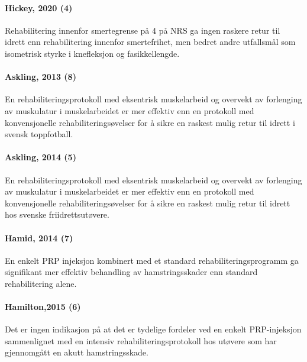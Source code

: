 \documentclass[
]{article}
\begin{document}
\hypertarget{hickey-2020-hickey2020-1}{%
\paragraph{Hickey, 2020 (4)}\label{hickey-2020-hickey2020-1}}

Rehabilitering innenfor smertegrense på 4 på NRS ga ingen raskere retur
til idrett enn rehabilitering innenfor smertefrihet, men bedret andre
utfallsmål som isometrisk styrke i knefleksjon og fasikkellengde.

\hypertarget{askling-2013-askling2013-1}{%
\paragraph{Askling, 2013 (8)}\label{askling-2013-askling2013-1}}

En rehabiliteringsprotokoll med eksentrisk muskelarbeid og overvekt av
forlenging av muskulatur i muskelarbeidet er mer effektiv enn en
protokoll med konvensjonelle rehabiliteringsøvelser for å sikre en
raskest mulig retur til idrett i svensk toppfotball.

\hypertarget{askling-2014-askling2014-1}{%
\paragraph{Askling, 2014 (5)}\label{askling-2014-askling2014-1}}

En rehabiliteringsprotokoll med eksentrisk muskelarbeid og overvekt av
forlenging av muskulatur i muskelarbeidet er mer effektiv enn en
protokoll med konvensjonelle rehabiliteringsøvelser for å sikre en
raskest mulig retur til idrett hos svenske friidrettsutøvere.

\hypertarget{hamid-2014-ahamid2014-1}{%
\paragraph{Hamid, 2014 (7)}\label{hamid-2014-ahamid2014-1}}

En enkelt PRP injeksjon kombinert med et standard
rehabiliteringsprogramm ga signifikant mer effektiv behandling av
hamstringsskader enn standard rehabilitering alene.

\hypertarget{hamilton2015-hamilton2015-1}{%
\paragraph{Hamilton,2015 (6)}\label{hamilton2015-hamilton2015-1}}

Det er ingen indikasjon på at det er tydelige fordeler ved en enkelt
PRP-injeksjon sammenlignet med en intensiv rehabiliteringsprotokoll hos
utøvere som har gjennomgått en akutt hamstringsskade.
\end{document}
